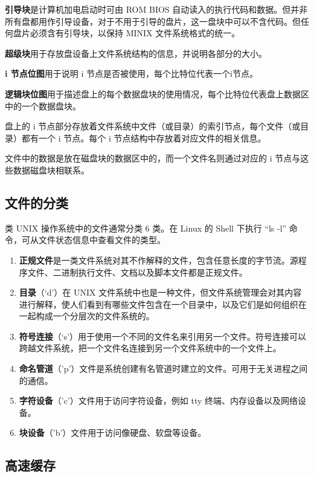 \textbf{引导块}是计算机加电启动时可由 ROM BIOS 自动读入的执行代码和数据。但并非所有盘都用作引导设备，对于不用于引导的盘片，这一盘块中可以不含代码。但任何盘片必须含有引导块，以保持 MINIX 文件系统格式的统一。

\textbf{超级块}用于存放盘设备上文件系统结构的信息，并说明各部分的大小。

\textbf{i 节点位图}用于说明 i 节点是否被使用，每个比特位代表一个i节点。

\textbf{逻辑块位图}用于描述盘上的每个数据盘块的使用情况，每个比特位代表盘上数据区中的一个数据盘块。

盘上的 i 节点部分存放着文件系统中文件（或目录）的索引节点，每个文件（或目录）都有一个 i 节点。每个 i 节点结构中存放着对应文件的相关信息。

文件中的数据是放在磁盘块的数据区中的，而一个文件名则通过对应的 i 节点与这些数据磁盘块相联系。

\subsection{文件的分类}

类 UNIX 操作系统中的文件通常分类 6 类。在 Linux 的 Shell 下执行 “ls -l” 命令，可从文件状态信息中查看文件的类型。

\begin{enumerate}
    \item \textbf{正规文件}是一类文件系统对其不作解释的文件，包含任意长度的字节流。源程序文件、二进制执行文件、文档以及脚本文件都是正规文件。
    \item \textbf{目录}（‘d’）在 UNIX 文件系统中也是一种文件，但文件系统管理会对其内容进行解释，使人们看到有哪些文件包含在一个目录中，以及它们是如何组织在一起构成一个分层次的文件系统的。
    \item \textbf{符号连接}（‘s’）用于使用一个不同的文件名来引用另一个文件。符号连接可以跨越文件系统，把一个文件名连接到另一个文件系统中的一个文件上。
    \item \textbf{命名管道}（’p’）文件是系统创建有名管道时建立的文件。可用于无关进程之间的通信。
    \item \textbf{字符设备}（’c’）文件用于访问字符设备，例如 tty 终端、内存设备以及网络设备。
    \item \textbf{块设备}（’b’）文件用于访问像硬盘、软盘等设备。
\end{enumerate}

\subsection{高速缓存}

